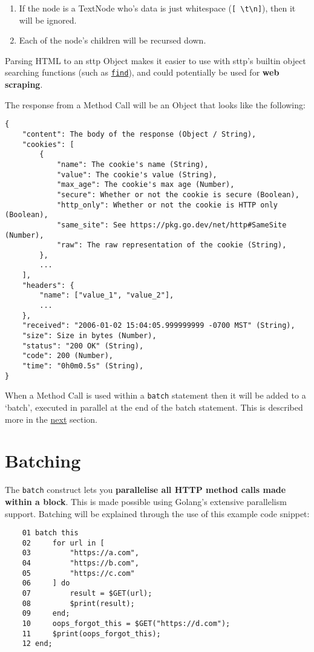 \begin{enumerate}
    \item If the node is a TextNode who's data is just whitespace (\verb|[ \t\n]|), then it will be ignored.
    \item Each of the node's children will be recursed down.
\end{enumerate}

Parsing HTML to an sttp Object makes it easier to use with sttp's builtin object searching functions (such as \hyperref[sec:builtin-find]{\texttt{find}}), and could potentially be used for \textbf{web scraping}.

The response from a Method Call will be an Object that looks like the following:

\begin{verbatim}
{
    "content": The body of the response (Object / String),
    "cookies": [
        {
            "name": The cookie's name (String),
            "value": The cookie's value (String),
            "max_age": The cookie's max age (Number),
            "secure": Whether or not the cookie is secure (Boolean),
            "http_only": Whether or not the cookie is HTTP only (Boolean),
            "same_site": See https://pkg.go.dev/net/http#SameSite (Number),
            "raw": The raw representation of the cookie (String),
        },
        ...
    ],
    "headers": {
        "name": ["value_1", "value_2"],
        ...
    },
    "received": "2006-01-02 15:04:05.999999999 -0700 MST" (String),
    "size": Size in bytes (Number),
    "status": "200 OK" (String),
    "code": 200 (Number),
    "time": "0h0m0.5s" (String),
}
\end{verbatim}

When a Method Call is used within a \verb|batch| statement then it will be added to a `batch', executed in parallel at the end of the batch statement. This is described more in the \hyperref[sec:batching]{next} section.

\section{Batching}
\label{sec:batching}

The \verb|batch| construct lets you \textbf{parallelise all HTTP method calls made within a block}. This is made possible using Golang's extensive parallelism support. Batching will be explained through the use of this example code snippet:

\begin{center}
    \begin{verbatim}
    01 batch this
    02     for url in [
    03         "https://a.com",
    04         "https://b.com",
    05         "https://c.com"
    06     ] do
    07         result = $GET(url);
    08         $print(result);
    09     end;
    10     oops_forgot_this = $GET("https://d.com");
    11     $print(oops_forgot_this);
    12 end;
    \end{verbatim}
\end{center}

